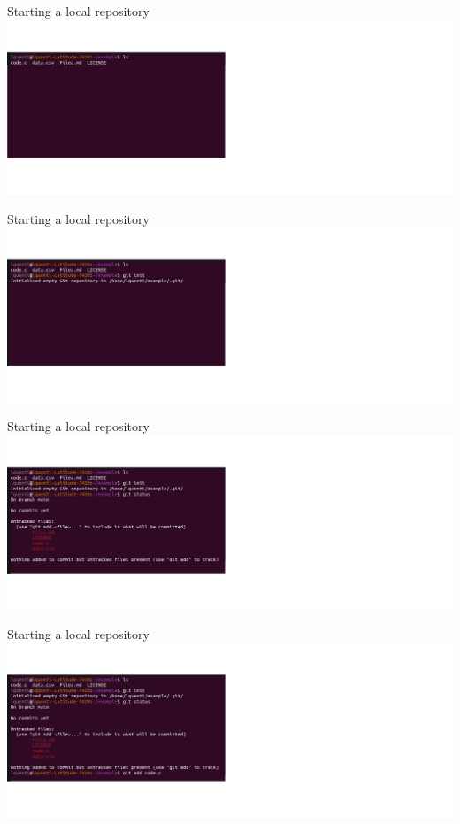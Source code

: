 \documentclass[compress,aspectratio=169]{beamer}
\begin{document}
  \begin{frame}{Starting a local repository}
    \includegraphics[width=\textwidth]{./assets/terminal_slideshows/01_add_existing_repo_01.png}
  \end{frame}
  \begin{frame}[noframenumbering]{Starting a local repository}
    \includegraphics[width=\textwidth]{./assets/terminal_slideshows/01_add_existing_repo_02.png}
  \end{frame}
  \begin{frame}[noframenumbering]{Starting a local repository}
    \includegraphics[width=\textwidth]{./assets/terminal_slideshows/01_add_existing_repo_03.png}
  \end{frame}
  \begin{frame}[noframenumbering]{Starting a local repository}
    \includegraphics[width=\textwidth]{./assets/terminal_slideshows/01_add_existing_repo_04.png}
  \end{frame}
\end{document}
